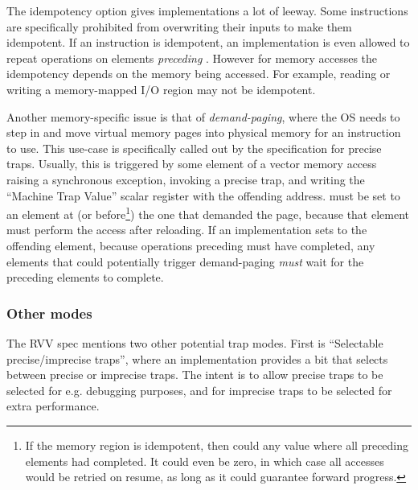The idempotency option gives implementations a lot of leeway.
Some instructions  are specifically prohibited from overwriting their inputs to make them idempotent.
If an instruction is idempotent, an implementation is even allowed to repeat operations on elements \emph{preceding} .
However for memory accesses the idempotency depends on the memory being accessed.
For example, reading or writing a memory-mapped I/O region may not be idempotent.

Another memory-specific issue is that of \emph{demand-paging}, where the OS needs to step in and move virtual memory pages into physical memory for an instruction to use.
This use-case is specifically called out by the specification for precise traps.
Usually, this is triggered by some element of a vector memory access raising a synchronous exception, invoking a precise trap, and writing the ``Machine Trap Value'' scalar register with the offending address.
 must be set to an element at (or before\footnote{If the memory region is idempotent, then  could any value where all preceding elements had completed. It could even be zero, in which case all accesses would be retried on resume, as long as it could guarantee forward progress.}) the one that demanded the page, because that element must perform the access after reloading.
If an implementation sets  to the offending element, because operations preceding  must have completed, any elements that could potentially trigger demand-paging \emph{must} wait for the preceding elements to complete.



\subsubsection{Other modes}
The RVV spec mentions two other potential trap modes.
First is \enquote{Selectable precise/imprecise traps}, where an implementation provides a bit that selects between precise or imprecise traps.
The intent is to allow precise traps to be selected for e.g. debugging purposes, and for imprecise traps to be selected for extra performance.


